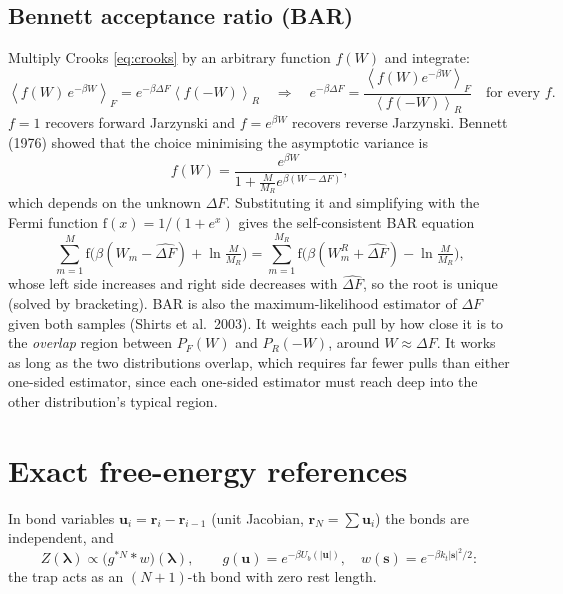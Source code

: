 \documentclass[11pt,a4paper]{article}
\newcommand{\avg}[1]{\left\langle #1\right\rangle}
\newcommand{\lam}{\bm{\lambda}}
\begin{document}
\subsection{Bennett acceptance ratio (BAR)}
Multiply Crooks \eqref{eq:crooks} by an arbitrary function $f(W)$ and integrate:
\begin{equation}
\avg{f(W)\,e^{-\beta W}}_F=e^{-\beta\Delta F}\avg{f(-W)}_R
\quad\Longrightarrow\quad
e^{-\beta\Delta F}=\frac{\avg{f(W)e^{-\beta W}}_F}{\avg{f(-W)}_R}\quad\text{for every }f .
\end{equation}
$f=1$ recovers forward Jarzynski and $f=e^{\beta W}$ recovers reverse Jarzynski. Bennett (1976) showed
that the choice minimising the asymptotic variance is
\begin{equation}
f(W)=\frac{e^{\beta W}}{1+\frac{M}{M_R}e^{\beta(W-\Delta F)}} ,
\end{equation}
which depends on the unknown $\Delta F$. Substituting it and simplifying with the Fermi function
$\mathrm f(x)=1/(1+e^x)$ gives the self-consistent BAR equation
\begin{equation}
\sum_{m=1}^{M}\mathrm f\!\Big(\beta(W_m-\widehat{\Delta F})+\ln\tfrac{M}{M_R}\Big)
=\sum_{m=1}^{M_R}\mathrm f\!\Big(\beta(W^R_m+\widehat{\Delta F})-\ln\tfrac{M}{M_R}\Big),
\label{eq:bar}
\end{equation}
whose left side increases and right side decreases with $\widehat{\Delta F}$, so the root is unique
(solved by bracketing). BAR is also the maximum-likelihood estimator of $\Delta F$ given both samples
(Shirts et al.\ 2003). It weights each pull by how close it is to the \emph{overlap} region
between $P_F(W)$ and $P_R(-W)$, around $W\approx\Delta F$. It works as long as the two
distributions overlap, which requires far fewer pulls than either one-sided estimator, since each
one-sided estimator must reach deep into the other distribution's typical region.

\section{Exact free-energy references}
\label{sec:exact}

In bond variables $\bm u_i=\bm r_i-\bm r_{i-1}$ (unit Jacobian, $\bm r_N=\sum\bm u_i$) the bonds are
independent, and
\begin{equation}
Z(\lam)\propto\big(g^{*N}*w\big)(\lam),\qquad g(\bm u)=e^{-\beta U_b(|\bm u|)},\quad w(\bm s)=e^{-\beta k_t|\bm s|^2/2}:
\label{eq:Zconv}
\end{equation}
the trap acts as an $(N{+}1)$-th bond with zero rest length.
\end{document}
